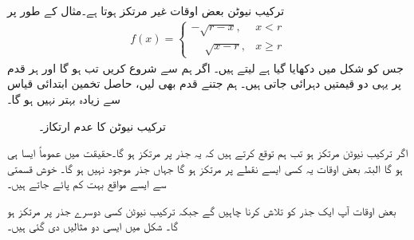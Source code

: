 ترکیب نیوٹن بعض اوقات غیر مرتکز ہوتا ہے۔مثال کے طور پر
\begin{align*}
f(x)=
\begin{cases}
-\sqrt{r-x},&x<r\\
\phantom{-}\sqrt{x-r},&x\ge r
\end{cases}
\end{align*}
جس کو شکل   میں دکھایا گیا ہے لیتے ہیں۔ اگر ہم  سے شروع کریں تب  ہو گا اور ہر قدم پر یہی دو قیمتیں دہرائی جاتی ہیں۔ ہم جتنے قدم بھی لیں، حاصل تخمین ابتدائی قیاس سے زیادہ بہتر نہیں ہو گا۔
\begin{figure}
\centering
\begin{minipage}{0.45\textwidth}
\centering
{}
\caption{
اگر  ہو تب نقطہ  تقاطع نہیں پایا جاتا  لہٰذا ترکیب نیوٹن رک جاتی ہے اور  نا قابل معلوم ہو گا۔
}
\label{شکل_استعمال_نیوٹن_رک_گیا}
\end{minipage}\hfill
\begin{minipage}{0.45\textwidth}
\centering
{}
\caption{ترکیب نیوٹن کا عدم ارتکاز۔}
\label{شکل_استعمال-نیوٹن_عدم_مرکوزیت}
\end{minipage}
\end{figure}

اگر ترکیب نیوٹن مرتکز ہو تب ہم توقع کرتے ہیں کہ یہ جذر پر مرتکز ہو گا۔حقیقت میں عموماً ایسا ہی ہو گا البتہ بعض اوقات یہ کسی ایسے نقطے پر مرتکز ہو گا جہاں جذر  موجود نہیں  ہو گا۔ خوش قسمتی سے ایسے مواقع بہت کم پائے جاتے ہیں۔

بعض اوقات آپ ایک جذر کو تلاش کرنا چاہیں گے جبکہ ترکیب نیوٹن کسی دوسرے جذر پر مرتکز ہو گا۔ شکل  میں ایسی دو مثالیں دی گئی ہیں۔ 

